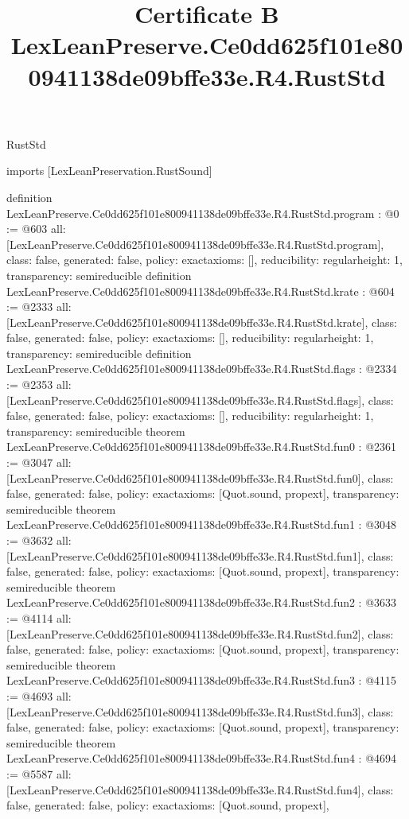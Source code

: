 \begin{lexlean}{RustStd}
\title{Certificate B LexLeanPreserve.Ce0dd625f101e800941138de09bffe33e.R4.RustStd}
\begin{coremodule}
imports [LexLeanPreservation.RustSound]

definition LexLeanPreserve.Ce0dd625f101e800941138de09bffe33e.R4.RustStd.program : @0 := @603 {
  all: [LexLeanPreserve.Ce0dd625f101e800941138de09bffe33e.R4.RustStd.program],
  class: false,
  generated: false,
  policy: exact{axioms: []},
  reducibility: regular{height: 1},
  transparency: semireducible
}
definition LexLeanPreserve.Ce0dd625f101e800941138de09bffe33e.R4.RustStd.krate : @604 := @2333 {
  all: [LexLeanPreserve.Ce0dd625f101e800941138de09bffe33e.R4.RustStd.krate],
  class: false,
  generated: false,
  policy: exact{axioms: []},
  reducibility: regular{height: 1},
  transparency: semireducible
}
definition LexLeanPreserve.Ce0dd625f101e800941138de09bffe33e.R4.RustStd.flags : @2334 := @2353 {
  all: [LexLeanPreserve.Ce0dd625f101e800941138de09bffe33e.R4.RustStd.flags],
  class: false,
  generated: false,
  policy: exact{axioms: []},
  reducibility: regular{height: 1},
  transparency: semireducible
}
theorem LexLeanPreserve.Ce0dd625f101e800941138de09bffe33e.R4.RustStd.fun0 : @2361 := @3047 {
  all: [LexLeanPreserve.Ce0dd625f101e800941138de09bffe33e.R4.RustStd.fun0],
  class: false,
  generated: false,
  policy: exact{axioms: [Quot.sound, propext]},
  transparency: semireducible
}
theorem LexLeanPreserve.Ce0dd625f101e800941138de09bffe33e.R4.RustStd.fun1 : @3048 := @3632 {
  all: [LexLeanPreserve.Ce0dd625f101e800941138de09bffe33e.R4.RustStd.fun1],
  class: false,
  generated: false,
  policy: exact{axioms: [Quot.sound, propext]},
  transparency: semireducible
}
theorem LexLeanPreserve.Ce0dd625f101e800941138de09bffe33e.R4.RustStd.fun2 : @3633 := @4114 {
  all: [LexLeanPreserve.Ce0dd625f101e800941138de09bffe33e.R4.RustStd.fun2],
  class: false,
  generated: false,
  policy: exact{axioms: [Quot.sound, propext]},
  transparency: semireducible
}
theorem LexLeanPreserve.Ce0dd625f101e800941138de09bffe33e.R4.RustStd.fun3 : @4115 := @4693 {
  all: [LexLeanPreserve.Ce0dd625f101e800941138de09bffe33e.R4.RustStd.fun3],
  class: false,
  generated: false,
  policy: exact{axioms: [Quot.sound, propext]},
  transparency: semireducible
}
theorem LexLeanPreserve.Ce0dd625f101e800941138de09bffe33e.R4.RustStd.fun4 : @4694 := @5587 {
  all: [LexLeanPreserve.Ce0dd625f101e800941138de09bffe33e.R4.RustStd.fun4],
  class: false,
  generated: false,
  policy: exact{axioms: [Quot.sound, propext]},
}
\end{coremodule}
\end{lexlean}

